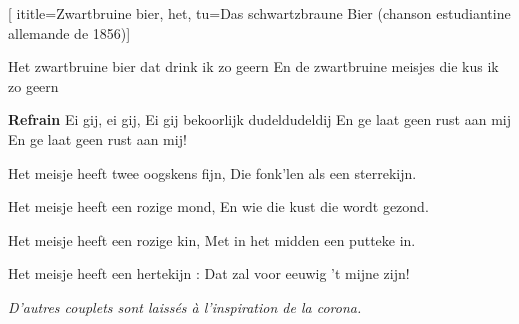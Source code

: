  [
ititle={Zwartbruine bier, het},
tu={Das schwartzbraune Bier (chanson estudiantine allemande de 1856)}]

\beginverse
Het zwartbruine bier dat drink ik zo geern
En de zwartbruine meisjes die kus ik zo geern
\endverse

\beginchorus
\textbf{Refrain}
Ei gij, ei gij,
Ei gij bekoorlijk dudeldudeldij
En ge laat geen rust aan mij
En ge laat geen rust aan mij!
\endchorus

\beginverse
Het meisje heeft twee oogskens fijn,
Die fonk'len als een sterrekijn.
\endverse

\beginverse
Het meisje heeft een rozige mond,
En wie die kust die wordt gezond.
\endverse

\beginverse
Het meisje heeft een rozige kin,
Met in het midden een putteke in.
\endverse

\beginverse
Het meisje heeft een hertekijn :
Dat zal voor eeuwig 't mijne zijn!
\endverse

\emph{D'autres couplets sont laissés à l'inspiration de la corona.}
\endsong 